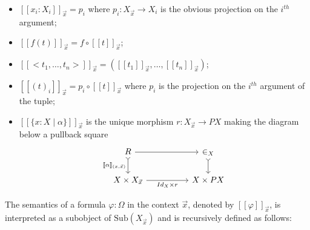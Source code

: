 \documentclass[preprint,3p,times]{elsarticle}
\newcommand{\Sub}{\mathrm{Sub}}
\def\sem#1{[\![ #1 ] \!]}
\begin{document}
\begin{itemize}
\item $\sem{x_i:X_i}_{\vec{x}} = p_i$ where $p_i : X_{\vec{x}} \to X_i$ is the obvious projection on the $i^{th}$ argument;
\item $\sem{f(t)}_{\vec{x}} = f \circ \sem{t}_{\vec{x}}$;
\item $\sem{<t_1,\ldots,t_n>}_{\vec{x}} = (\sem{t_1}_{\vec{x}},\ldots,\sem{t_n}_{\vec{x}})$;
\item $\sem{(t)_i}_{\vec{x}} = p_i \circ \sem{t}_{\vec{x}}$ where $p_i$ is the projection on the $i^{th}$ argument of the tuple;
\item $\sem{\{x:X \mid \alpha\}}_{\vec{x}}$ is the unique morphism $r : X_{\vec{x}} \to PX$ making the diagram below a pullback square
\[\begin{tikzcd}[column sep = 5em]
	R & {\in_X} \\
	{X \times X_{\vec{x}}} & {X \times PX}
	\arrow[from=1-1, to=1-2]
	\arrow[tail, from=1-2, to=2-2]
	\arrow["{\sem{\alpha}_{(x,\vec{x})}}"', tail, from=1-1, to=2-1]
	\arrow["{Id_X \times r}"', from=2-1, to=2-2]
\end{tikzcd}\]
\end{itemize}

The semantics of a formula $\varphi:\Omega$ in the context $\vec{x}$, denoted by $\sem{\varphi}_{\vec{x}}$, is interpreted as a subobject of $\Sub(X_{\vec{x}})$ and is recursively defined as follows:
 
\end{document}
